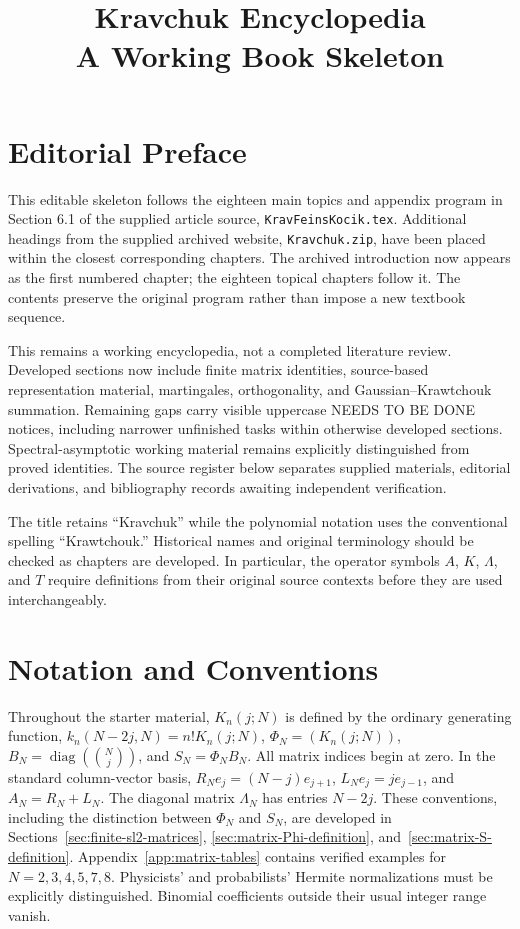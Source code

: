 \documentclass[11pt,oneside]{amsbook}
\title{Kravchuk Encyclopedia\\ A Working Book Skeleton}
\date{}
\theoremstyle{definition}
\theoremstyle{remark}
\begin{document}
\frontmatter
\maketitle

\chapter*{Editorial Preface}
This editable skeleton follows the eighteen main topics and appendix program in Section 6.1 of the supplied article source, \texttt{KravFeinsKocik.tex}. Additional headings from the supplied archived website, \texttt{Kravchuk.zip}, have been placed within the closest corresponding chapters. The archived introduction now appears as the first numbered chapter; the eighteen topical chapters follow it. The contents preserve the original program rather than impose a new textbook sequence.

This remains a working encyclopedia, not a completed literature review. Developed sections now include finite matrix identities, source-based representation material, martingales, orthogonality, and Gaussian--Krawtchouk summation. Remaining gaps carry visible uppercase NEEDS TO BE DONE notices, including narrower unfinished tasks within otherwise developed sections. Spectral-asymptotic working material remains explicitly distinguished from proved identities. The source register below separates supplied materials, editorial derivations, and bibliography records awaiting independent verification.

The title retains ``Kravchuk'' while the polynomial notation uses the conventional spelling ``Krawtchouk.'' Historical names and original terminology should be checked as chapters are developed. In particular, the operator symbols $A$, $K$, $\Lambda$, and $T$ require definitions from their original source contexts before they are used interchangeably.
\chapter*{Notation and Conventions}
Throughout the starter material, $K_n(j;N)$ is defined by the ordinary generating function, $k_n(N-2j,N)=n!K_n(j;N)$, $\Phi_N=(K_n(j;N))$, $B_N=\operatorname{diag}(\binom Nj)$, and $S_N=\Phi_NB_N$. All matrix indices begin at zero. In the standard column-vector basis,
$R_Ne_j=(N-j)e_{j+1}$, $L_Ne_j=je_{j-1}$, and $A_N=R_N+L_N$.
The diagonal matrix $\Lambda_N$ has entries $N-2j$.
These conventions, including the distinction between $\Phi_N$ and
$S_N$, are developed in Sections~\ref{sec:finite-sl2-matrices},
\ref{sec:matrix-Phi-definition}, and~\ref{sec:matrix-S-definition}.
Appendix~\ref{app:matrix-tables} contains verified examples for
$N=2,3,4,5,7,8$. Physicists' and probabilists' Hermite normalizations must be explicitly distinguished. Binomial coefficients outside their usual integer range vanish.
\end{document}
